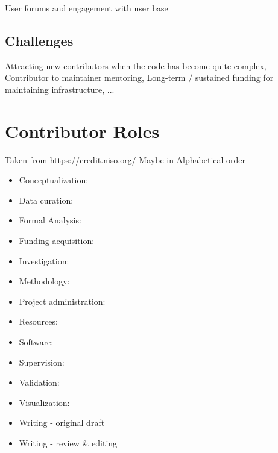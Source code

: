 \documentclass[modern]{aastex631}
\begin{document}
User forums and engagement with user base

\subsection{Challenges}

Attracting new contributors when the code has become quite complex,
Contributor to maintainer mentoring,
Long-term / sustained funding for maintaining infrastructure,
...

\section{Contributor Roles}

Taken from \url{https://credit.niso.org/}
Maybe in Alphabetical order
\begin{itemize}
    \item Conceptualization:
    \item Data curation:
    \item Formal Analysis:
    \item Funding acquisition:
    \item Investigation:
    \item Methodology:
    \item Project administration:
    \item Resources:
    \item Software: 
    \item Supervision:
    \item Validation:
    \item Visualization: 
    \item Writing - original draft
    \item Writing - review & editing
\end{itemize}
\end{document}
